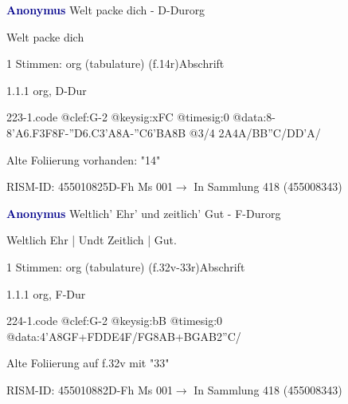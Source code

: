 \documentclass[twocolumn]{book}
\begin{document}
\par \vspace{7pt} \textcolor{darkblue}{\textbf{Anonymus  }}\hfillplus{\textbf{[223]}}\newline Welt packe dich - D-Dur\newline org
\par \begin{itshape}[f.14r, at left:] Welt packe dich\end{itshape} 
\par \textcolor{darkblue}{}  1 Stimmen: org (tabulature)  (f.14r)\newline Abschrift
\par 1.1.1  org, D-Dur  
\begin{filecontents*}{223-1.code}
@clef:G-2
@keysig:xFC
@timesig:0
@data:8-{8'A6.F3F}8F-{''D6.C3'A}8A-''C{6'BA}8B @3/4 2A4A/BB''C/DD'A/
\end{filecontents*}
\newline
%
\par Alte Foliierung vorhanden: "14"
\par RISM-ID: 455010825\newline D-Fh  Ms 001\newline $\rightarrow$ In Sammlung 418 (455008343)
      
\par \vspace{7pt} \textcolor{darkblue}{\textbf{Anonymus  }}\hfillplus{\textbf{[224]}}\newline Weltlich' Ehr' und zeitlich' Gut - F-Dur\newline org
\par \begin{itshape}[f.32v, at left:] Weltlich Ehr | Undt Zeitlich | Gut.\end{itshape} 
\par \textcolor{darkblue}{}  1 Stimmen: org (tabulature)  (f.32v-33r)\newline Abschrift
\par 1.1.1  org, F-Dur  
\begin{filecontents*}{224-1.code}
@clef:G-2
@keysig:bB
@timesig:0
@data:4'A{8GF+}{FDDE}4F/FG{8AB+}{BGAB}2''C/
\end{filecontents*}
\newline
%
\par Alte Foliierung auf f.32v mit "33"
\par RISM-ID: 455010882\newline D-Fh  Ms 001\newline $\rightarrow$ In Sammlung 418 (455008343)
      
\end{document}
